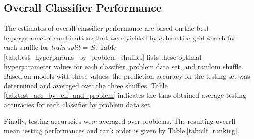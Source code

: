 \documentclass[twoside,11pt]{article}
\begin{document}
		\subsection{Overall Classifier Performance}
			The estimates of overall classifier performance are based on the best hyperparameter combinations that were yielded by exhaustive grid search for each shuffle for \textit{train split} = .8. Table \ref{tab:best_hyperparams_by_problem_shuffles} lists these optimal hyperparameter values for each classifier, problem data set, and random shuffle. Based on models with these values, the prediction accuracy on the testing set was determined and averaged over the three shuffles. Table \ref{tab:test_acc_by_clf_and_problem} indicates the thus obtained average testing accuracies for each classifier by problem data set.
			
			Finally, testing accuracies were averaged over problems. The resulting overall mean testing performances and rank order is given by Table \ref{tab:clf_ranking}.
			
			\begin{table}[h]
				\caption{Best hyperparameter values after grid search by classifier and problem in each of three random shuffles (0.8 train split):}
				\label{tab:best_hyperparams_by_problem_shuffles}
			
			\end{table}
			
\end{document}
